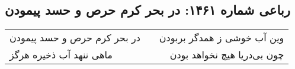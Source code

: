 \begin{center}
\section*{رباعی شماره ۱۴۶۱: در بحر کرم حرص و حسد پیمودن}
\label{sec:1461}
\begin{longtable}{l p{0.5cm} r}
در بحر کرم حرص و حسد پیمودن
&&
وین آب خوشی ز همدگر بربودن
\\
ماهی ننهد آب ذخیره هرگز
&&
چون بی‌دریا هیچ نخواهد بودن
\\
\end{longtable}
\end{center}

